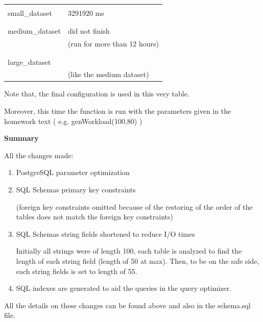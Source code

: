 \documentclass[10pt]{article}
\begin{document}
\begin{enumerate}
\begin{table}[H]
\begin{tabular}{|P{9.7cm} | P{6cm}|}
				&\\
				small\_dataset & 3291920 ms \\
				&\\
				\hline
				
				&\\
				medium\_dataset & did not finish\\
				&(run for more than 12 hours)\\
				&\\
				\hline
				
				&\\
				large\_dataset & \\
				&(like the medium dataset)\\
				\hline
				 
			\end{tabular}
			\vspace{3ex}
			
			Note that, the final configuration is used in this very table.
			
			Moreover, this time the function is run with the parameters given in the homework text ( e.g. genWorkload(100,80) )
		\end{table}
		
		\textbf{Summary}
		
		All the changes made:
		\begin{enumerate}
			\item PostgreSQL parameter optimization
			
			\item SQL Schemas primary key constraints
			
			(foreign key constraints omitted because of the restoring of the order of the tables does not match the foreign key constraints)
			
			\item SQL Schemas string fields shortened to reduce I/O times
			
			Initially all strings were of length 100, each table is analyzed to find the length of each string field (length of 50 at max). Then, to be on the safe side, each string fields is set to length of 55.
			
			\item SQL indexes are generated to aid the queries in the query optimizer.
		\end{enumerate}
		
		All the details on these changes can be found above and also in the schema.sql file.
		

\end{enumerate}
\end{document}
